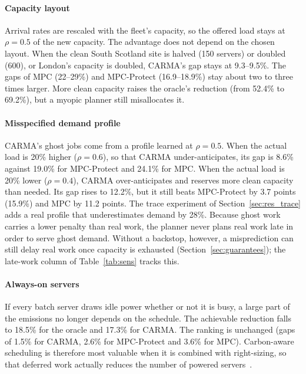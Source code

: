 \paragraph{Capacity layout} Arrival rates are rescaled with the fleet's capacity, so the offered load stays at $\rho=0.5$ of the new capacity. The advantage does not depend on the chosen layout. When the clean South Scotland site is halved (150 servers) or doubled (600), or London's capacity is doubled, CARMA's gap stays at 9.3--9.5\%. The gaps of MPC (22--29\%) and MPC-Protect (16.9--18.9\%) stay about two to three times larger. More clean capacity raises the oracle's reduction (from 52.4\% to 69.2\%), but a myopic planner still misallocates it.

\paragraph{Misspecified demand profile} CARMA's ghost jobs come from a profile learned at $\rho=0.5$. When the actual load is 20\% higher ($\rho=0.6$), so that CARMA under-anticipates, its gap is 8.6\% against 19.0\% for MPC-Protect and 24.1\% for MPC. When the actual load is 20\% lower ($\rho=0.4$), CARMA over-anticipates and reserves more clean capacity than needed. Its gap rises to 12.2\%, but it still beats MPC-Protect by 3.7 points (15.9\%) and MPC by 11.2 points. The trace experiment of Section~\ref{sec:res_trace} adds a real profile that underestimates demand by 28\%. Because ghost work carries a lower penalty than real work, the planner never plans real work late in order to serve ghost demand. Without a backstop, however, a misprediction can still delay real work once capacity is exhausted (Section~\ref{sec:guarantees}); the late-work column of Table~\ref{tab:sens} tracks this.

\paragraph{Always-on servers} If every batch server draws idle power whether or not it is busy, a large part of the emissions no longer depends on the schedule. The achievable reduction falls to 18.5\% for the oracle and 17.3\% for CARMA. The ranking is unchanged (gaps of 1.5\% for CARMA, 2.6\% for MPC-Protect and 3.6\% for MPC). Carbon-aware scheduling is therefore most valuable when it is combined with right-sizing, so that deferred work actually reduces the number of powered servers~\cite{lin2013dynamic}.

